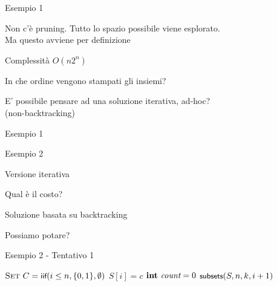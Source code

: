 \begin{frame}{Esempio 1}
	
\BIL
\item Non c'è pruning. Tutto lo spazio possibile viene esplorato.\\
Ma questo avviene per definizione
\item Complessità $O(n 2^n)$
\item In che ordine vengono stampati gli insiemi?
\item E' possibile pensare ad una soluzione iterativa, ad-hoc?\\
(non-backtracking)
\EIL

\end{frame}

\begin{frame}{Esempio 1}

\begin{Procedure}
\caption[A]{\enumerasottoinsiemi(\INTEGER $n$)}
\end{Procedure}


\end{frame}


\begin{frame}{Esempio 2}


\BIL
\item Versione iterativa
\BI
\item Qual è il costo?
\EI
\item Soluzione basata su backtracking
\BI
\item Possiamo potare?
\EI
\EIL


\end{frame}

\begin{frame}{Esempio 2 - Tentativo 1}

\begin{Procedure}
\caption[A]{\enumerasottoinsiemi($\INTEGER[\,]\ S$, \INTEGER $n$, \INTEGER $k$, \INTEGER $i$)}
$\textsc{Set}\ C = \textsf{{\small iif}}(i \leq n, \{ 0, 1 \}, \emptyset)$\;
{
  $S[i] = c$\;
  {
    $\INTEGER\ \Count = 0$\;
  }
  $\textsf{{\small subsets}}(S, n, k, i+1)$\;
}
\end{Procedure}

\end{frame}

